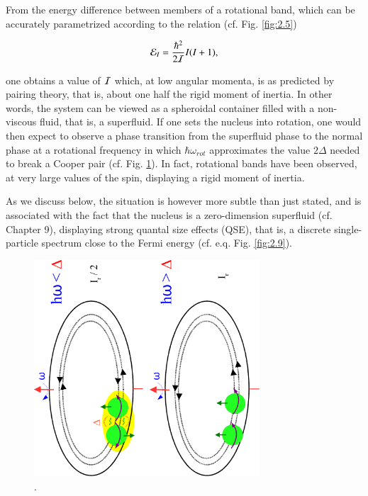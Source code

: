 \documentclass[a4paper,14pt]{book}
\begin{document}
From the energy difference between members of a rotational band, which can be accurately parametrized according to the relation (cf. Fig. \ref{fig:2.5})

\begin{equation}
{\cal E}_I = \frac{\hbar^2}{2 {\cal I}} I(I+1),
\label{eqn:89}
\end{equation}

\noindent one obtains a value of ${\cal I}$ which, at low angular momenta, is as predicted by pairing theory, that is, about one half the rigid moment of inertia. In other words, the system can be viewed as a spheroidal container filled with a non-viscous fluid, that is, a superfluid. If one sets the nucleus into rotation, one would then expect to observe a phase transition from the superfluid phase to the normal phase at a rotational frequency in which $\hbar \omega_{rot}$ approximates the value $2 \Delta$ needed to break a Cooper pair (cf. Fig. \ref{fig:8.6}). In fact, rotational bands have been observed, at very large values of the spin, displaying a rigid moment of inertia.

As we discuss below, the situation is however more subtle than just stated, and is associated with the fact that the nucleus is a zero-dimension superfluid (cf. Chapter 9), displaying strong quantal size effects (QSE), that is, a discrete single-particle spectrum close to the Fermi energy (cf. e.q. Fig. \ref{fig:2.9}).

\begin{figure}[h!]
\centerline{
\includegraphics*[width=0.75\textwidth]{figs_C7S/fig_8_6}
}
\caption{.}
\label{fig:8.6}
\end{figure}
\end{document}

